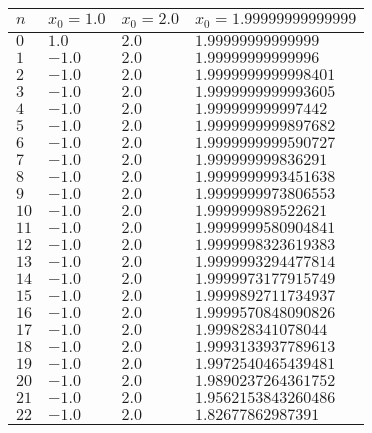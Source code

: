 \documentclass[12pt]{article}
\begin{document}
        \begin{table}[h!]
        \centering
        \begin{tabularx}{0.55\textwidth}{l l l l}
            \hline
            $n$ & $x_0 = 1.0$ & $x_0 = 2.0$ & $x_0 = 1.99999999999999$ \\
            \hline
            $0$ & $1.0$ & $2.0$ & $1.99999999999999$ \\
            $1$ & $-1.0$ & $2.0$ & $1.99999999999996$ \\
            $2$ & $-1.0$ & $2.0$ & $1.9999999999998401$ \\
            $3$ & $-1.0$ & $2.0$ & $1.9999999999993605$ \\
            $4$ & $-1.0$ & $2.0$ & $1.999999999997442$ \\
            $5$ & $-1.0$ & $2.0$ & $1.9999999999897682$ \\
            $6$ & $-1.0$ & $2.0$ & $1.9999999999590727$ \\
            $7$ & $-1.0$ & $2.0$ & $1.999999999836291$ \\
            $8$ & $-1.0$ & $2.0$ & $1.9999999993451638$ \\
            $9$ & $-1.0$ & $2.0$ & $1.9999999973806553$ \\
            $10$ & $-1.0$ & $2.0$ & $1.999999989522621$ \\
            $11$ & $-1.0$ & $2.0$ & $1.9999999580904841$ \\
            $12$ & $-1.0$ & $2.0$ & $1.9999998323619383$ \\
            $13$ & $-1.0$ & $2.0$ & $1.9999993294477814$ \\
            $14$ & $-1.0$ & $2.0$ & $1.9999973177915749$ \\
            $15$ & $-1.0$ & $2.0$ & $1.9999892711734937$ \\
            $16$ & $-1.0$ & $2.0$ & $1.9999570848090826$ \\
            $17$ & $-1.0$ & $2.0$ & $1.999828341078044$ \\
            $18$ & $-1.0$ & $2.0$ & $1.9993133937789613$ \\
            $19$ & $-1.0$ & $2.0$ & $1.9972540465439481$ \\
            $20$ & $-1.0$ & $2.0$ & $1.9890237264361752$ \\
            $21$ & $-1.0$ & $2.0$ & $1.9562153843260486$ \\
            $22$ & $-1.0$ & $2.0$ & $1.82677862987391$ \\

\end{tabularx}
\end{table}
\end{document}
